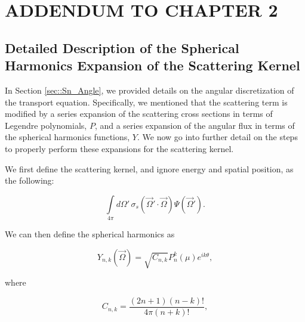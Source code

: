 %
%
%

\chapter{\uppercase{Addendum to Chapter 2}}
\label{sec::appendix_SN}

\section{Detailed Description of the Spherical Harmonics Expansion of the Scattering Kernel}
\label{sec::appendix_SN_Scattering}

In Section \ref{sec::Sn_Angle}, we provided details on the angular discretization of the transport equation. Specifically, we mentioned that the scattering term is modified by a series expansion of the scattering cross sections in terms of Legendre polynomials, $P$, and a series expansion of the angular flux in terms of the spherical harmonics functions, $Y$. We now go into further detail on the steps to properly perform these expansions for the scattering kernel.

We first define the scattering kernel, and ignore energy and spatial position, as the following:

\begin{equation}
\label{eq::App_SN_scatt_kernel}
\int\limits_{4 \pi} d \Omega' \, \sigma_s (\vec{\Omega}' \cdot \vec{\Omega}) \Psi (\vec{\Omega}') .
\end{equation}

\noindent We can then define the spherical harmonics as

\begin{equation}
\label{eq::App_SN_sph_harm_funcs}
Y_{n,k} (\vec{\Omega}) = \sqrt{C_{n,k}} P_n^k (\mu) e^{i k \theta} ,
\end{equation}

\noindent where

\begin{equation}
\label{eq::App_SN_sph_harm_consts}
C_{n,k} = \frac{(2n +1)(n-k)!}{4 \pi (n+k) !} ,
\end{equation}

